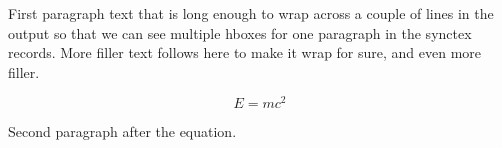 \documentclass[a4paper,11pt]{article}
\begin{document}
First paragraph text that is long enough to wrap across a couple of lines in the output so that we can see multiple hboxes for one paragraph in the synctex records. More filler text follows here to make it wrap for sure, and even more filler.

\begin{equation}
E = mc^2
\end{equation}

Second paragraph after the equation.
\end{document}
